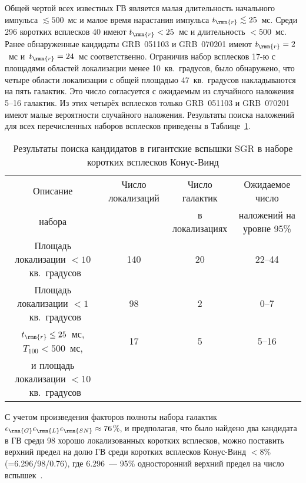 Общей чертой всех известных ГВ является малая длительность начального импульса 
$\lesssim 500$~мс и малое время нарастания импульса $t_{\rmn{r}} \lesssim 25$~мс. 
Среди 296 коротких всплесков 40 имеют $t_{\rmn{r}}<25$~мс и длительность $<500$~мс. 
Ранее обнаруженные кандидаты GRB~051103 и GRB~070201 имеют $t_{\rmn{r}}=2$~мс 
и~$t_{\rmn{r}}=24$~мс соответственно. Ограничив набор всплесков 17-ю с площадями 
областей локализации менее 10~кв.~градусов, было обнаружено, что четыре области 
локализации с общей площадью 47~кв.~градусов накладываются на пять галактик. 
Это число согласуется с ожидаемым из случайного наложения 5--16 галактик. Из этих 
четырёх всплесков только GRB~051103 и GRB~070201 имеют малые вероятности случайного наложения.
Результаты поиска наложений для всех перечисленных наборов всплесков приведены 
в Таблице~\ref{tab:SearchResults}.

\begin{table}[h]
  \centering
  \scriptsize
  \caption{Результаты поиска кандидатов в гигантские вспышки SGR в 
  наборе коротких всплесков Конус-Винд}
  \label{tab:SearchResults}
  \begin{tabular}{cccc}
  \hline
  \hline
Описание & Число локализаций  & Число галактик & Ожидаемое число  \\
набора   &                    & в локализациях & наложений на уровне 95\% \\
\hline
Площадь локализации $<10$~кв.~градусов  & 140 & 20 & 22--44 \\
Площадь локализации $<1$~кв.~градусов   & 98 & 2 & 0--7\\
$t_{\rmn{r}} \leq 25$~мс, $T_{100}<500$~мс, & 17 & 5 & 5--16\\
и площадь локализации $<10$~кв.~градусов & & & \\
\hline
\end{tabular}
\end{table}

С учетом произведения факторов полноты набора галактик $\epsilon_{\rmn{G}} \epsilon_{\rmn{L}} \epsilon_{\rmn{SN}} \approx 76$\%, 
и предполагая, что было найдено два кандидата в ГВ среди 98 хорошо локализованных коротких всплесков, 
можно поставить верхний предел на долю ГВ среди коротких всплесков Конус-Винд 
$<8$\% (=6.296/98/0.76), где 6.296~--- 95\% односторонний верхний предел на 
число вспышек~\citep{Gehrels1986}.

